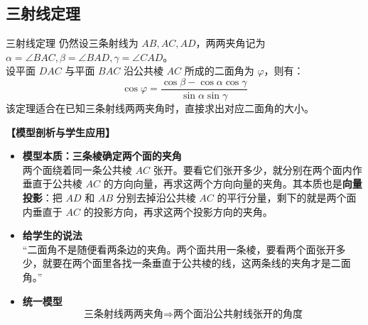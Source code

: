 \documentclass[11pt,a4paper]{ctexart}
\begin{document}
\subsection{三射线定理}

\begin{theorembox}{三射线定理}
仍然设三条射线为 $AB, AC, AD$，两两夹角记为 $\alpha = \angle BAC, \beta = \angle BAD, \gamma = \angle CAD$。\\
设平面 $DAC$ 与平面 $BAC$ 沿公共棱 $AC$ 所成的二面角为 $\varphi$，则有：
\[ \cos\varphi = \frac{\cos\beta - \cos\alpha \cos\gamma}{\sin\alpha \sin\gamma} \]
该定理适合在已知三条射线两两夹角时，直接求出对应二面角的大小。
\end{theorembox}

\noindent\textbf{【模型剖析与学生应用】}
\begin{itemize}
    \item \textbf{模型本质：三条棱确定两个面的夹角} \\
    两个面绕着同一条公共棱 $AC$ 张开。要看它们张开多少，就分别在两个面内作垂直于公共棱 $AC$ 的方向向量，再求这两个方向向量的夹角。其本质也是\textbf{向量投影}：把 $AD$ 和 $AB$ 分别去掉沿公共棱 $AC$ 的平行分量，剩下的就是两个面内垂直于 $AC$ 的投影方向，再求这两个投影方向的夹角。
    \item \textbf{给学生的说法} \\
    “二面角不是随便看两条边的夹角。两个面共用一条棱，要看两个面张开多少，就要在两个面里各找一条垂直于公共棱的线，这两条线的夹角才是二面角。”
    \item \textbf{统一模型} \\
    \[ \text{三条射线两两夹角} \Rightarrow \text{两个面沿公共射线张开的角度} \]
\end{itemize}
\end{document}
